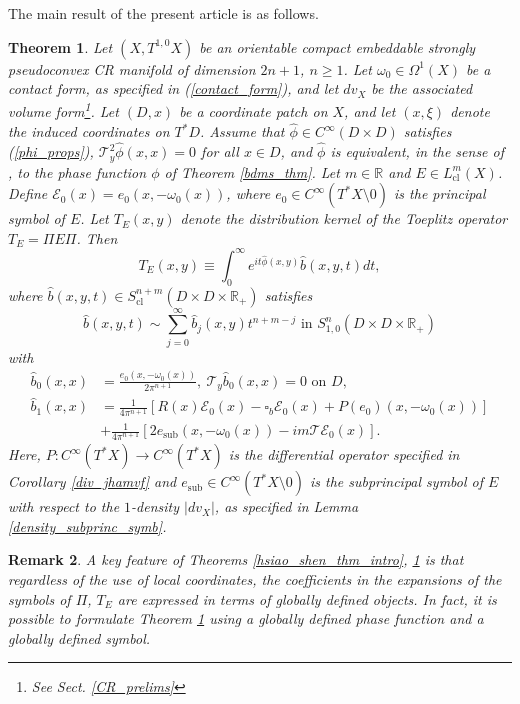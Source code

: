 \documentclass{article}
\newtheorem{theorem}{Theorem}[section]
\newtheorem{remark}[theorem]{Remark}
\newcommand{\RR}{\mathbb R}
\newcommand{\mce}{\mathcal E}
\newcommand{\mct}{\mathcal T}
\DeclareMathOperator{\sub}{sub}
\DeclareMathOperator{\cl}{cl}
\begin{document}
The main result of the present article is as follows.
%
\begin{theorem}\label{main_thm} Let $(X, T^{1,0}X)$ be an orientable compact embeddable strongly pseudoconvex CR manifold of dimension $2n+1$, $n\ge 1$. Let $\omega_0 \in \Omega^1(X)$ be a contact form, as specified in (\ref{contact_form}), and let $dv_X$ be the associated volume form\footnote{See Sect. \ref{CR_prelims}}. Let $(D,x)$ be a coordinate patch on $X$, and let $(x,\xi)$ denote the induced coordinates on $T^*D$. Assume that $\hat \phi \in C^\infty(D \times D)$ satisfies (\ref{phi_props}), $\mct_y^2 \hat \phi(x,x) = 0$ for all $x \in D$, and $\hat \phi$ is equivalent, in the sense of \cite{ms}, to the phase function $\phi$ of Theorem \ref{bdms_thm}. Let $m \in \RR$ and $E \in L^m_{\cl}(X)$. Define $\mce_0(x) = e_0(x, -\omega_0(x))$, where $e_0 \in C^\infty(T^*X \setminus 0)$ is the principal symbol of $E$.  Let $T_E(x,y)$ denote the distribution kernel of the Toeplitz operator $T_E = \Pi E \Pi$. Then
\begin{equation*} T_E(x,y) \equiv \int_0^\infty e^{it  \hat \phi(x,y)} \hat b(x,y,t) dt,\end{equation*}
where $\hat b(x,y,t) \in S^{n+m}_{\cl}(D \times D \times \RR_+)$ satisfies
\begin{equation*} \hat b(x,y,t) \sim \sum_{j=0}^\infty \hat b_{j}(x,y) t^{n+m-j}\text{ in } S^n_{1,0}(D \times D \times \RR_+)\end{equation*}
with \begin{equation}\label{main_formula} \begin{aligned} \hat b_{0}(x,x) &= \frac{e_0(x,-\omega_0(x))}{2\pi^{n+1}},\ \mct_y \hat b_0(x,x) = 0\text{ on }D,\\ \hat b_{1}(x,x) &= \frac 1 {4\pi^{n+1}}\left[R(x) \mathcal E_0(x) -\square_b \mathcal E_0(x)  + P(e_0)(x, -\omega_0(x))\right]\\&+\frac 1 {4\pi^{n+1}} \left[2 e_{\sub}(x, -\omega_0(x))-i m \mct \mce_0(x) \right].\end{aligned} \end{equation} Here, $P :C^\infty(T^*X) \to C^\infty(T^*X)$ is the differential operator specified in Corollary \ref{div_jhamvf} and $e_{\sub} \in C^\infty(T^*X\setminus 0)$ is the subprincipal symbol of $E$ with respect to the $1$-density $|dv_X|$, as specified in Lemma \ref{density_subprinc_symb}.\end{theorem}
%
\begin{remark} A key feature of Theorems \ref{hsiao_shen_thm_intro}, \ref{main_thm} is that regardless of the use of local coordinates, the coefficients in the expansions of the symbols of $\Pi$, $T_E$ are expressed in terms of globally defined objects. In fact, it is possible to formulate Theorem \ref{main_thm} using a globally defined phase function and a globally defined symbol.\end{remark}
\end{document}
